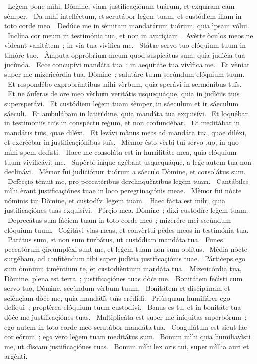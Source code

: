 {~Leġem pone mìhi, Dòmine, viam justificaçiónum tuárum, et exquíram eam sèmper.
~Da mìhi intelléctum, et scrutábor leġem tuam, et custódiem illam in toto corde meo.
~Dedúce me in sémitam mandatórum tuórum, quia ìpsam vólui.
~Inclína cor meum in testimónia tua, et non in avarìçiam.
~Avèrte òculos meos ne vìdeant vanitátem~; in via tua vivìfica me.
~Státue servo tuo elóquium tuum in timóre tuo.
~Àmputa oppróbrium meum quod suspicátus sum, quia judìċia tua jucùnda.
~Ecċe concupívi mandáta tua~; in aequitáte tua vivìfica me.
~Et vèniat super me mizericórdia tua, Dòmine~; salutáre tuum secùndum elóquium tuum.
~Et respondébo exprobràntibus mìhi vèrbum, quia sperávi in sermónibus tuïs.
~Et ne áuferas de ore meo vèrbum veritátis usquequáque, quia in judìċiïs tuïs supersperávi.
~Et custódiem leġem tuam sèmper, in sáeculum et in sáeculum sáeculi.
~Et ambulábam in latitúdine, quia mandáta tua exquisívi.
~Et loquébar in testimóniïs tuïs in conspèctu reġum, et non confundébar.
~Et meditábar in mandátïs tuïs, quae diléxi.
~Et levávi mànüs meas ad mandáta tua, quae diléxi, et exerċébar in justificaçiónibus tuïs.
~Mèmor èsto vèrbi tui servo tuo, in quo mìhi spem dedìsti.
~Haec me consoláta est in humilitáte mea, quia elóquium tuum vivificávit me.
~Supèrbi iníque agébant usquequáque, a leġe autem tua non declinávi.
~Mèmor fui judiċiórum tuórum a sáeculo Dòmine, et consolátus sum.
~Defècçio tènuit me, pro peccatóribus derelinquèntibus leġem tuam.
~Cantábiles mìhi èrant justificaçiónes tuae in loco peregrinaçiónis meae.
~Mèmor fui nòcte nóminis tui Dòmine, et custodívi leġem tuam.
~Haec fàcta est mìhi, quia justificaçiónes tuas exquisívi.
~Pórçio mea, Dòmine~; dixi custodíre leġem tuam.
~Deprecátus sum fàċiem tuam in toto corde meo~; mizerére mei secùndum elóquium tuum.
~Coġitávi vias meas, et convèrtui pèdes meos in testimónia tua.
~Parátus sum, et non sum turbátus, ut custódiam mandáta tua.
~Funes peccatórum çircumplèxi sunt me, et leġem tuam non sum oblítus.
~Mèdia nòcte surgébam, ad confitèndum tìbi super judìċia justificaçiónis tuae.
~Pártiċeps ego sum òmnium timèntium te, et custodièntium mandáta tua.
~Mizericórdia tua, Dòmine, plena est terra~; justificaçiónes tuas dòċe me.
~Bonitátem feċìsti cum servo tuo, Dòmine, secùndum vèrbum tuum.
~Bonitátem et disċiplínam et sciènçiam dòċe me, quia mandátïs tuïs crédidi.
~Priùsquam humiliárer ego delíqui~; proptèrea elóquium tuum custodívi.
~Bonus es tu, et in bonitáte tua dòċe me justificaçiónes tuas.
~Multiplicáta est super me iníquitas superbórum~; ego autem in toto corde meo scrutábor mandáta tua.
~Coagulátum est sicut lac cor eórum~; ego vero leġem tuam meditátus sum.
~Bonum mìhi quia humiliavìsti me, ut dìscam justificaçiónes tuas.
~Bonum mìhi lex oris tui, super mìllia auri et arġènti.
}
